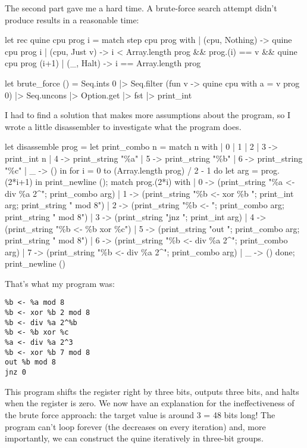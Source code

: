 \documentclass{article}
\begin{document}
The second part gave me a hard time.
A brute-force search attempt didn't produce results in a reasonable time:

\begin{code}[ocaml]
let rec quine cpu prog i =
  match step cpu prog with
  | (cpu, Nothing) -> quine cpu prog i
  | (cpu, Just v) -> i < Array.length prog && prog.(i) == v && quine cpu prog (i+1)
  | (_, Halt) -> i == Array.length prog

let brute_force () =
  Seq.ints 0 |> Seq.filter (fun v -> quine {cpu with a = v} prog 0)
  |> Seq.uncons |> Option.get |> fst |> print_int
\end{code}

I had to find a solution that makes more assumptions about the program,
so I wrote a little disassembler to investigate what the program does.

\begin{code}[ocaml]
let disassemble prog =
  let print_combo n = match n with | 0 | 1 | 2 | 3 -> print_int n
                                   | 4 -> print_string "\%a"
                                   | 5 -> print_string "\%b"
                                   | 6 -> print_string "\%c"
                                   | _ -> () in
  for i = 0 to (Array.length prog) / 2  - 1 do
    let arg = prog.(2*i+1) in
    print_newline ();
    match prog.(2*i) with
    | 0 -> (print_string "\%a <- div \%a 2^"; print_combo arg)
    | 1 -> (print_string "\%b <- xor \%b "; print_int arg; print_string " mod 8")
    | 2 -> (print_string "\%b <- "; print_combo arg; print_string " mod 8")
    | 3 -> (print_string "jnz "; print_int arg)
    | 4 -> (print_string "\%b <- \%b xor \%c")
    | 5 -> (print_string "out "; print_combo arg; print_string " mod 8")
    | 6 -> (print_string "\%b <- div \%a 2^"; print_combo arg)
    | 7 -> (print_string "\%b <- div \%a 2^"; print_combo arg)
    | _ -> ()
  done;
  print_newline ()
\end{code}

That's what my program was:
\begin{verbatim}
%b <- %a mod 8
%b <- xor %b 2 mod 8
%b <- div %a 2^%b
%b <- %b xor %c
%a <- div %a 2^3
%b <- xor %b 7 mod 8
out %b mod 8
jnz 0
\end{verbatim}

This program shifts the  register right by three bits, outputs three bits, and halts when the register is zero.
We now have an explanation for the ineffectiveness of the brute force approach: the target  value is around 3 = 48 bits long!
The program can't loop forever (the  decreases on every iteration) and, more importantly, we can construct the quine iteratively in three-bit groups.
\end{document}
